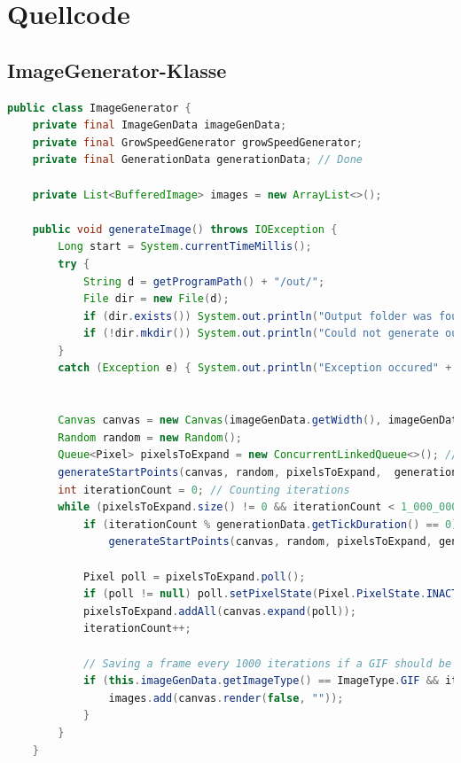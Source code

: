\documentclass[a4paper,10pt,ngerman]{scrartcl}
\begin{document}
\newpage
\section{Quellcode}
\subsection{ImageGenerator-Klasse}
\begin{lstlisting}[language=Java]
public class ImageGenerator {
    private final ImageGenData imageGenData;
    private final GrowSpeedGenerator growSpeedGenerator;
    private final GenerationData generationData; // Done

    private List<BufferedImage> images = new ArrayList<>();

    public void generateImage() throws IOException {
        Long start = System.currentTimeMillis();
        try {
            String d = getProgramPath() + "/out/";
            File dir = new File(d);
            if (dir.exists()) System.out.println("Output folder was found");
            if (!dir.mkdir()) System.out.println("Could not generate output folder!");
        }
        catch (Exception e) { System.out.println("Exception occured" + e);}


        Canvas canvas = new Canvas(imageGenData.getWidth(), imageGenData.getHeight(), Color.BLACK);
        Random random = new Random();
        Queue<Pixel> pixelsToExpand = new ConcurrentLinkedQueue<>(); // Pixels that can grow
        generateStartPoints(canvas, random, pixelsToExpand,  generationData.getInitialSP());
        int iterationCount = 0; // Counting iterations
        while (pixelsToExpand.size() != 0 && iterationCount < 1_000_000) {
            if (iterationCount % generationData.getTickDuration() == 0) 
            	generateStartPoints(canvas, random, pixelsToExpand, generationData.getSPperTick());
            
            Pixel poll = pixelsToExpand.poll();
            if (poll != null) poll.setPixelState(Pixel.PixelState.INACTIVE);
            pixelsToExpand.addAll(canvas.expand(poll));
            iterationCount++;

            // Saving a frame every 1000 iterations if a GIF should be generated
            if (this.imageGenData.getImageType() == ImageType.GIF && iterationCount % 1000 == 0) {
                images.add(canvas.render(false, ""));
            }
        }
    }


\end{lstlisting}
\end{document}
